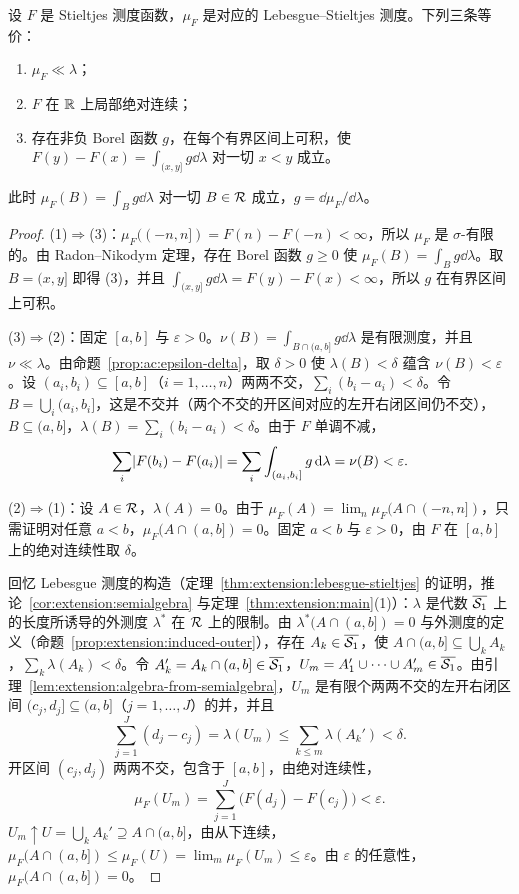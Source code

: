 \begin{theorem}\label{thm:ac:stieltjes-ac}
设 $F$ 是 Stieltjes 测度函数，$\mu_F$ 是对应的 Lebesgue--Stieltjes 测度。下列三条等价：
\begin{enumerate}
\item $\mu_F\ll\lambda$；
\item $F$ 在 $\mathbb{R}$ 上局部绝对连续；
\item 存在非负 Borel 函数 $g$，在每个有界区间上可积，使 $F(y)-F(x)=\int_{(x,y]}g\dd\lambda$ 对一切 $x<y$ 成立。
\end{enumerate}
此时 $\mu_F(B)=\int_Bg\dd\lambda$ 对一切 $B\in\mathcal{R}$ 成立，$g=\dd\mu_F/\dd\lambda$。
\end{theorem}
\begin{proof}
(1)$\Rightarrow$(3)：$\mu_F((-n,n])=F(n)-F(-n)<\infty$，所以 $\mu_F$ 是 $\sigma$-有限的。由 Radon--Nikodym 定理，存在 Borel 函数 $g\geqslant0$ 使 $\mu_F(B)=\int_Bg\dd\lambda$。取 $B=(x,y]$ 即得 (3)，并且 $\int_{(x,y]}g\dd\lambda=F(y)-F(x)<\infty$，所以 $g$ 在有界区间上可积。

(3)$\Rightarrow$(2)：固定 $[a,b]$ 与 $\varepsilon>0$。$\nu(B)=\int_{B\cap(a,b]}g\dd\lambda$ 是有限测度，并且 $\nu\ll\lambda$。由命题~\ref{prop:ac:epsilon-delta}，取 $\delta>0$ 使 $\lambda(B)<\delta$ 蕴含 $\nu(B)<\varepsilon$。设 $(a_i,b_i)\subseteq[a,b]$（$i=1,\dots,n$）两两不交，$\sum_i(b_i-a_i)<\delta$。令 $B=\bigcup_i(a_i,b_i]$，这是不交并（两个不交的开区间对应的左开右闭区间仍不交），$B\subseteq(a,b]$，$\lambda(B)=\sum_i(b_i-a_i)<\delta$。由于 $F$ 单调不减，
\[
\sum_i\lvert F(b_i)-F(a_i)\rvert=\sum_i\int_{(a_i,b_i]}g\,\mathrm{d}\lambda=\nu(B)<\varepsilon .
\]

(2)$\Rightarrow$(1)：设 $A\in\mathcal{R}$，$\lambda(A)=0$。由于 $\mu_F(A)=\lim_n\mu_F(A\cap(-n,n])$，只需证明对任意 $a<b$，$\mu_F(A\cap(a,b])=0$。固定 $a<b$ 与 $\varepsilon>0$，由 $F$ 在 $[a,b]$ 上的绝对连续性取 $\delta$。

回忆 Lebesgue 测度的构造（定理~\ref{thm:extension:lebesgue-stieltjes} 的证明，推论~\ref{cor:extension:semialgebra} 与定理~\ref{thm:extension:main}(1)）：$\lambda$ 是代数 $\overline{\mathcal{S}_1}$ 上的长度所诱导的外测度 $\lambda^*$ 在 $\mathcal{R}$ 上的限制。由 $\lambda^*(A\cap(a,b])=0$ 与外测度的定义（命题~\ref{prop:extension:induced-outer}），存在 $A_k\in\overline{\mathcal{S}_1}$，使 $A\cap(a,b]\subseteq\bigcup_kA_k$，$\sum_k\lambda(A_k)<\delta$。令 $A_k'=A_k\cap(a,b]\in\overline{\mathcal{S}_1}$，$U_m=A_1'\cup\cdots\cup A_m'\in\overline{\mathcal{S}_1}$。由引理~\ref{lem:extension:algebra-from-semialgebra}，$U_m$ 是有限个两两不交的左开右闭区间 $(c_j,d_j]\subseteq(a,b]$（$j=1,\dots,J$）的并，并且
\[
\sum_{j=1}^J(d_j-c_j)=\lambda(U_m)\leqslant\sum_{k\leqslant m}\lambda(A_k')<\delta .
\]
开区间 $(c_j,d_j)$ 两两不交，包含于 $[a,b]$，由绝对连续性，
\[
\mu_F(U_m)=\sum_{j=1}^J\bigl(F(d_j)-F(c_j)\bigr)<\varepsilon .
\]
$U_m\uparrow U=\bigcup_kA_k'\supseteq A\cap(a,b]$，由从下连续，$\mu_F(A\cap(a,b])\leqslant\mu_F(U)=\lim_m\mu_F(U_m)\leqslant\varepsilon$。由 $\varepsilon$ 的任意性，$\mu_F(A\cap(a,b])=0$。


\end{proof}
